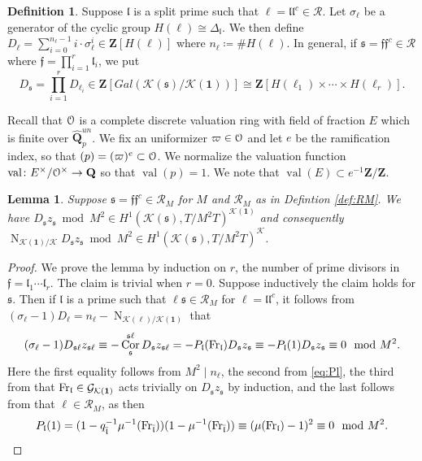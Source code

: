 \documentclass[leqno]{amsart}
\newtheorem{lem}[thm]{Lemma}
\theoremstyle{definition}
\newtheorem{defn}[thm]{Definition}
\theoremstyle{remark}
\newcommand{\id}{\mathbf{1}}
\newcommand{\eo}{\EuScript{O}}
\newcommand{\Q}{{\mathbf{Q}}}
\newcommand{\Z}{{\mathbf{Z}}}
\DeclareMathOperator{\Nr}{N}
\DeclareMathOperator{\Cor}{Cor}
\DeclareMathOperator{\val}{val} %
\DeclareMathOperator{\Gal}{\mathcal{G}}
\newcommand{\Fr}{\textnormal{Fr}} %
\newcommand{\ff}{\mathfrak{f}}
\newcommand{\fl}{\mathfrak{l}}
\newcommand{\fs}{\mathfrak{s}}
\newcommand{\K}{{\mathcal{K}}} %
\newcommand{\bl}{{\bar{\fl}}}
\begin{document}
\begin{defn}

Suppose $\fl$ is a split prime such that 
$\ell=\fl\fl^c\in \mathcal{R}$.
Let $\sigma_\ell$
be a generator of the cyclic group
$H(\ell)\cong \Delta_\fl$.
We then define
$D_\ell=\sum_{i=0}^{n_\ell-1}i\cdot \sigma_\ell^i
\in \Z[H(\ell)]$
where $n_\ell\coloneqq\#H(\ell)$.
In general, if $\fs=\ff\ff^c\in\mathcal{R}$
where $\ff=\prod_{i=1}^r\fl_i$, we put
\[
    D_\fs=\prod_{i=1}^r D_{\ell_i}\in 
    \Z[Gal(\K(\fs)/\K(\id))]\cong 
    \Z[H(\ell_1)\times\cdots\times H(\ell_r)].
\]
\end{defn}










Recall that $\eo$ is a complete discrete valuation ring
with field of fraction $E$ which is finite over $\widehat{\Q}_p^{un}$.
We fix an uniformizer $\varpi\in\eo$
and let $e$ be the ramification index,
so that $(p)=(\varpi)^e\subset \eo$.
We normalize the valuation function
$\val\colon E^\times/\eo^\times\to \Q$
so that $\val(p)=1$.
We note that $\val(E)\subset e^{-1}\Z/\Z$.






\begin{lem}

Suppose $\fs=\ff\ff^c\in\mathcal{R}_M$
for $M$ and $\mathcal{R}_M$ as in Defintion \ref{def:RM}.
We have $D_{\fs}z_{\fs}\bmod M^2\in 
H^1(\K(\fs),T/{M^2}T)^{\K(\id)}$
and consequently
$\Nr_{\K(\id)/\K}D_\fs z_\fs\bmod M^2\in
H^1(\K(\fs),T/{M^2}T)^{\K}$.
\end{lem}

\begin{proof}

We prove the lemma by induction on $r$,
the number of prime divisors in  $\ff=\fl_1\cdots\fl_r$.
The claim is trivial when $r=0$.
Suppose inductively the claim holds for $\fs$.
Then if $\fl$ is a prime such that 
$\ell\fs\in\mathcal{R}_M$ for $\ell=\fl\fl^c$,
it follows from 
$(\sigma_\ell-1)D_\ell=n_\ell-\Nr_{\K(\ell)/\K(\id)}$
that
\[
	 (\sigma_\ell-1)D_{\fs\ell}z_{\fs\ell}\equiv
	 -\Cor^{\fs\ell}_{\fs}D_{\fs}z_{\fs\ell}=
	 -P_\fl(\Fr_{\fl})D_{\fs}z_{\fs} \equiv
	 -P_\fl(1)D_{\fs}z_{\fs}\equiv 0\mod M^2.
\]
Here the first equality follows from $M^2\mid n_\ell$,
the second from \eqref{eq:Pl},
the third from that
$\Fr_\fl\in \Gal_{\K(\id)}$ acts trivially on $D_\fs z_\fs$
by induction,
and the last follows from that $\ell\in\mathcal{R}_M$, as then
\[P_\fl(1)=(1-q_\bl^{-1}\mu^{-1}(\Fr_\bl))(1-\mu^{-1}(\Fr_\bl))
\equiv (\mu(\Fr_\fl)-1)^2 \equiv 0\mod M^2.\]
\end{proof}
\end{document}
